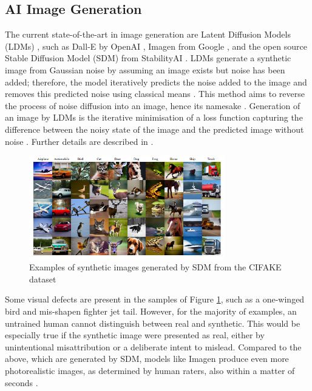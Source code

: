 \subsection{AI Image Generation}

The current state-of-the-art in image generation are Latent Diffusion Models (LDMs) \cite{bird_2023}, such as Dall-E by OpenAI \cite{ramesh_2021}, Imagen from Google \cite{saharia_2022}, and the open source Stable Diffusion Model (SDM) from StabilityAI \cite{rombach_2022}. LDMs generate a synthetic image from Gaussian noise by assuming an image exists but noise has been added; therefore, the model iteratively predicts the noise added to the image and removes this predicted noise using classical means \cite{bird_2023}. This method aims to reverse the process of noise diffusion into an image, hence its namesake \cite{bird_2023}. Generation of an image by LDMs is the iterative minimisation of a loss function capturing the difference between the noisy state of the image and the predicted image without noise \cite{bird_2023}. Further details are described in \cite{rombach_2022}.

\begin{figure}[ht]
  \centering
  \includegraphics[width=0.76\textwidth]{images/q3_sdm_samples.png}
  \caption{Examples of synthetic images generated by SDM from the CIFAKE dataset \cite{bird_2023}}
  \label{fig:sdm_samples}
\end{figure}

Some visual defects are present in the samples of Figure \ref{fig:sdm_samples}, such as a one-winged bird and mis-shapen fighter jet tail. However, for the majority of examples, an untrained human cannot distinguish between real and synthetic. This would be especially true if the synthetic image were presented as real, either by unintentional misattribution or a deliberate intent to mislead. Compared to the above, which are generated by SDM, models like Imagen produce even more photorealistic images, as determined by human raters, also within a matter of seconds \cite{saharia_2022}.

